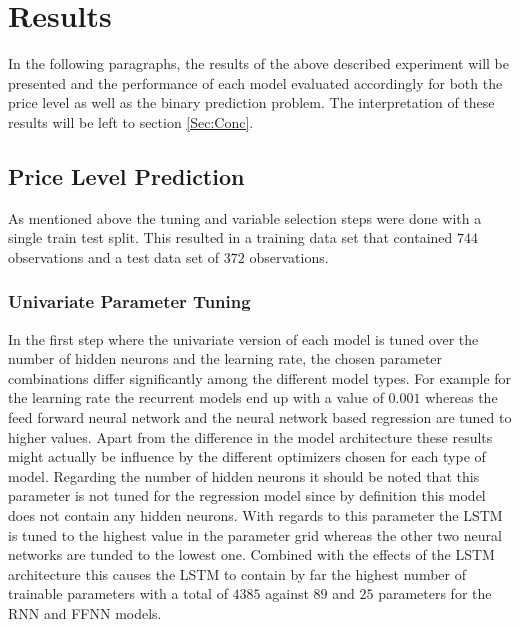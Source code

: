 \section{Results}
In the following paragraphs, the results of the above described experiment will be presented and the performance of each model evaluated accordingly for both the price level as well as the binary prediction problem. The interpretation of these results will be left to section \ref{Sec:Conc}.
\subsection{Price Level Prediction}
As mentioned above the tuning and variable selection steps were done with a single train test split. This resulted in a training data set that contained $744$ observations and a test data set of $372$ observations.
\subsubsection{Univariate Parameter Tuning}
In the first step where the univariate version of each model is tuned over the number of hidden neurons and the learning rate, the chosen parameter combinations differ significantly among the different model types. For example for the learning rate the recurrent models end up with a value of $0.001$ whereas the feed forward neural network and the neural network based regression are tuned to higher values. Apart from the difference in the model architecture these results might actually be influence by the different optimizers chosen for each type of model. Regarding the number of hidden neurons it should be noted that this parameter is not tuned for the regression model since by definition this model does not contain any hidden neurons. With regards to this parameter the LSTM is tuned to the highest value in the parameter grid whereas the other two neural networks are tunded to the lowest one. Combined with the effects of the LSTM architecture this causes the LSTM to contain by far the highest number of trainable parameters with a total of $4385$ against $89$ and $25$ parameters for the RNN and FFNN models.

